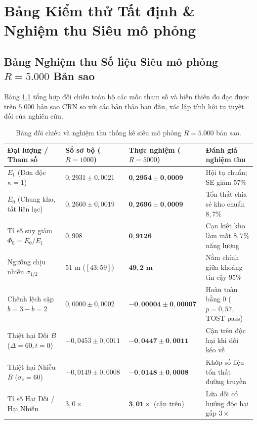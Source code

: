 \documentclass[11pt,a4paper]{report}
\renewcommand{\arraystretch}{1.22}
\begin{document}
\chapter{Bảng Kiểm thử Tất định \& Nghiệm thu Siêu mô phỏng}

\section{Bảng Nghiệm thu Số liệu Siêu mô phỏng \texorpdfstring{$R = 5.000$}{R = 5000} Bản sao}
Bảng \ref{tab:super_audit} tổng hợp đối chiếu toàn bộ các mốc tham số và biến thiên đo đạc được trên $5.000$ bản sao CRN so với các bản thảo ban đầu, xác lập tính hội tụ tuyệt đối của nghiên cứu.

\begin{table}[!htbp]
\centering
\footnotesize
\renewcommand{\arraystretch}{1.06}
\caption{Bảng đối chiếu và nghiệm thu thống kê siêu mô phỏng $R = 5.000$ bản sao.}\label{tab:super_audit}
\begin{tabularx}{\textwidth}{@{}p{}p{}p{}>{\raggedright\arraybackslash}X@{}}
\toprule
\textbf{Đại lượng / Tham số} & \textbf{Số sơ bộ ($R=1000$)} & \textbf{Thực nghiệm ($R=5000$)} & \textbf{Đánh giá nghiệm thu} \\
\midrule
$E_1$ (Đơn độc $\kappa=1$) & $0{,}2931 \pm 0{,}0021$ & $\mathbf{0{,}2954 \pm 0{,}0009}$ & Hội tụ chuẩn; SE giảm $57\%$ \\
$E_0$ (Chung kho, tắt liên lạc) & $0{,}2660 \pm 0{,}0019$ & $\mathbf{0{,}2696 \pm 0{,}0009}$ & Tổn thất chia sẻ kho chuẩn $8{,}7\%$ \\
Tỉ số suy giảm $\Phi_0 = E_0/E_1$ & $0{,}908$ & $\mathbf{0{,}9126}$ & Cạn kiệt kho làm mất $8{,}7\%$ năng lượng \\
Ngưỡng chịu nhiễu $\sigma_{1/2}$ & $51\text{ m}$ ($[43; 59]$) & $\mathbf{49{,}2\text{ m}}$ & Nằm chính giữa khoảng tin cậy $95\%$ \\
Chênh lệch cặp $b=3 - b=2$ & $0{,}0000 \pm 0{,}0002$ & $\mathbf{-0{,}00004 \pm 0{,}00007}$ & Hoàn toàn bằng $0$ ($p=0{,}57$, TOST pass) \\
Thiệt hại Dối $B$ ($\Delta=60, t=0$) & $-0{,}0453 \pm 0{,}0011$ & $\mathbf{-0{,}0447 \pm 0{,}0011}$ & Cận trên độc hại khi dối kéo về \\
Thiệt hại Nhiễu $B$ ($\sigma_c=60$) & $-0{,}0149 \pm 0{,}0008$ & $\mathbf{-0{,}0148 \pm 0{,}0008}$ & Khớp số liệu tổn thất đường truyền \\
Tỉ số Hại Dối / Hại Nhiễu & $3{,}0\times$ & $\mathbf{3{,}01\times}$ (cận trên) & Lừa dối có hướng độc hại gấp $3\times$ \\

\end{tabularx}
\end{table}
\end{document}
